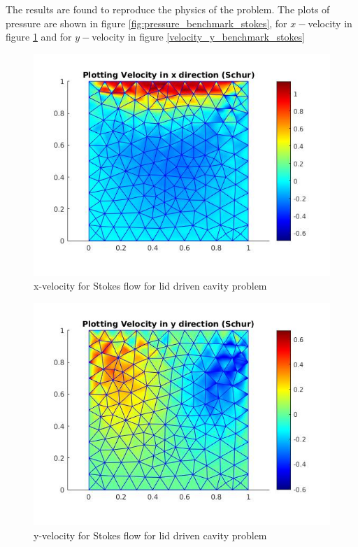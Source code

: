 \documentclass[a4paper,12pt]{book}
\begin{document}
The results are found to reproduce the physics of the problem. The plots of pressure are shown in figure \ref{fig:pressure_benchmark_stokes}, for $x-$velocity in figure \ref{fig:velocity_x_benchmark_stokes} and for $y-$velocity in figure \ref{velocity_y_benchmark_stokes}


\begin{figure}
  \includegraphics[width=\linewidth]{velocity_x_schur.jpg}
  \caption{x-velocity for Stokes flow for lid driven cavity problem}
  \label{fig:velocity_x_benchmark_stokes}
\end{figure}

\begin{figure}
  \includegraphics[width=\linewidth]{velocity_y_schur.jpg}
  \caption{y-velocity for Stokes flow for lid driven cavity problem}
  \label{fig:velocity_y_benchmark_stokes}
\end{figure}
\end{document}
